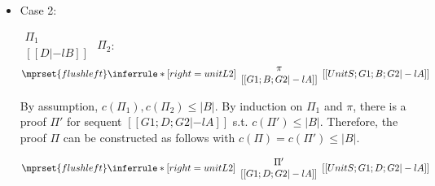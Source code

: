 \begin{itemize}
\item Case 2:
      \begin{center}
        \scriptsize
        \begin{math}
          \begin{array}{c}
            \Pi_1 \\
            {[[D |-l B]]}
          \end{array}
        \end{math}
        \qquad\qquad
        $\Pi_2$:
        \begin{math}
          $$\mprset{flushleft}
          \inferrule* [right={\tiny unitL2}] {
            {
              \begin{array}{c}
                \pi \\
                {[[G1; B; G2 |-l A]]}
              \end{array}
            }
          }{[[UnitS; G1; B; G2 |-l A]]}
        \end{math}
      \end{center}
      By assumption, $c(\Pi_1),c(\Pi_2)\leq |B|$. By induction on $\Pi_1$
      and $\pi$, there is a proof $\Pi'$ for sequent $[[G1; D; G2 |-l A]]$
      s.t. $c(\Pi') \leq |B|$. Therefore, the proof $\Pi$ can be
      constructed as follows with $c(\Pi) = c(\Pi') \leq |B|$.
      \begin{center}
        \scriptsize
        \begin{math}
          $$\mprset{flushleft}
          \inferrule* [right={\tiny unitL2}] {
            {
              \begin{array}{c}
                \Pi' \\
                {[[G1; D; G2 |-l A]]}
              \end{array}
            }
          }{[[UnitS; G1; D; G2 |-l A]]}
        \end{math}
      \end{center}
\end{itemize}



